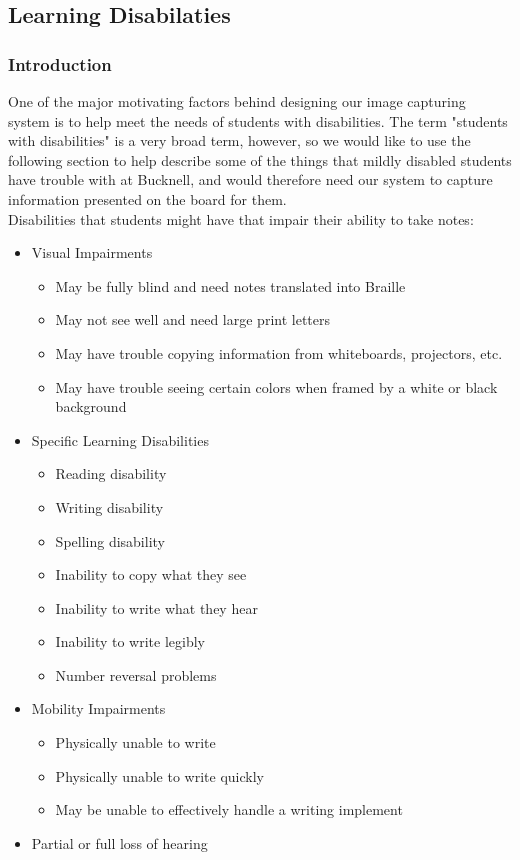 \documentclass[]{article}
\begin{document}
\subsection{Learning Disabilaties}
        \subsubsection*{Introduction}
One of the major motivating factors behind designing our image capturing system is to help meet the needs of students with disabilities. The term "students with disabilities" is a very broad term, however, so we would like to use the following section to help describe some of the things that mildly disabled students have trouble with at Bucknell, and would therefore need our system to capture information presented on the board for them. \\
Disabilities that students might have that impair their ability to take notes: \cite{disability}
    \begin{itemize}
        \item Visual Impairments
        \begin{itemize}
            \item May be fully blind and need notes translated into Braille
            \item May not see well and need large print letters
            \item May have trouble copying information from whiteboards, projectors, etc.
            \item May have trouble seeing certain colors when framed by a white or black background
        \end{itemize}
        \item Specific Learning Disabilities
        \begin{itemize}
            \item Reading disability
            \item Writing disability
            \item Spelling disability
            \item Inability to copy what they see
            \item Inability to write what they hear
            \item Inability to write legibly
            \item Number reversal problems
        \end{itemize}
        \item Mobility Impairments
        \begin{itemize}
            \item Physically unable to write
            \item Physically unable to write quickly
            \item May be unable to effectively handle a writing implement
        \end{itemize}
        \item Partial or full loss of hearing
    \end{itemize}
\end{document}
